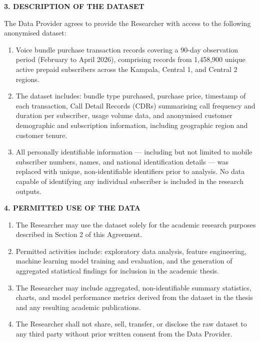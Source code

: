 \vspace{0.3cm}
\textbf{3. DESCRIPTION OF THE DATASET}

The Data Provider agrees to provide the Researcher with access to the following anonymised dataset:

\begin{enumerate}
    \item Voice bundle purchase transaction records covering a 90-day observation period (February to April 2026), comprising records from 1,458,900 unique active prepaid subscribers across the Kampala, Central 1, and Central 2 regions.
    \item The dataset includes: bundle type purchased, purchase price, timestamp of each transaction, Call Detail Records (CDRs) summarising call frequency and duration per subscriber, usage volume data, and anonymised customer demographic and subscription information, including geographic region and customer tenure.
    \item All personally identifiable information --- including but not limited to mobile subscriber numbers, names, and national identification details --- was replaced with unique, non-identifiable identifiers prior to analysis. No data capable of identifying any individual subscriber is included in the research outputs.
\end{enumerate}

\vspace{0.3cm}
\textbf{4. PERMITTED USE OF THE DATA}

\begin{enumerate}
    \item The Researcher may use the dataset solely for the academic research purposes described in Section 2 of this Agreement.
    \item Permitted activities include: exploratory data analysis, feature engineering, machine learning model training and evaluation, and the generation of aggregated statistical findings for inclusion in the academic thesis.
    \item The Researcher may include aggregated, non-identifiable summary statistics, charts, and model performance metrics derived from the dataset in the thesis and any resulting academic publications.
    \item The Researcher shall not share, sell, transfer, or disclose the raw dataset to any third party without prior written consent from the Data Provider.
\end{enumerate}

